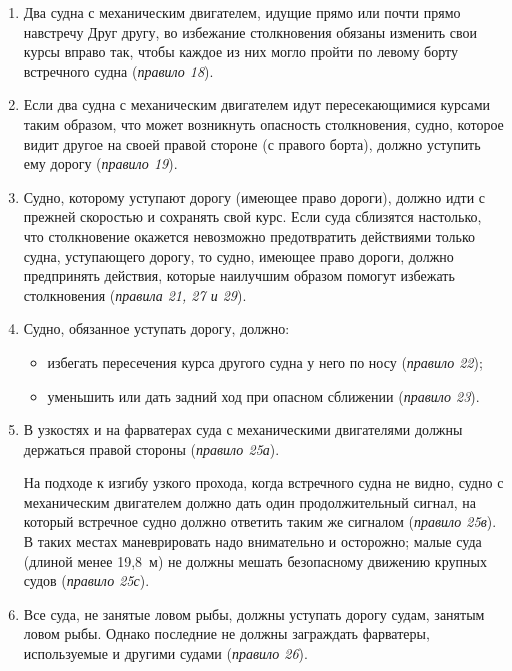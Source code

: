 \documentclass[a4paper, 12pt, twoside, final]{scrbook}
\begin{document}
\begin{enumerate}
\item Два судна с механическим двигателем, идущие прямо или почти прямо навстречу Друг другу, во избежание столкновения обязаны изменить свои курсы вправо так, чтобы каждое из них могло пройти по левому борту встречного судна (\textit{правило 18}).

\item Если два судна с механическим двигателем идут пересекающимися курсами таким образом, что может возникнуть опасность столкновения, судно, которое видит другое на своей правой стороне (с правого борта), должно уступить ему дорогу (\textit{правило 19}).

\item Судно, которому уступают дорогу (имеющее право дороги), должно идти с прежней скоростью и сохранять свой курс. Если суда сблизятся настолько, что столкновение окажется невозможно предотвратить действиями только судна, уступающего дорогу, то судно, имеющее право дороги, должно предпринять действия, которые наилучшим образом помогут избежать столкновения (\textit{правила 21, 27 и 29}).

\item Судно, обязанное уступать дорогу, должно:

\begin{itemize}
\item избегать пересечения курса другого судна у него по носу (\textit{правило 22});
\item уменьшить или дать задний ход при опасном сближении (\textit{правило 23}).
\end{itemize}

\item В узкостях и на фарватерах суда с механическими двигателями должны держаться правой стороны (\textit{правило 25а}).

На подходе к изгибу узкого прохода, когда встречного судна не видно, судно с механическим двигателем должно дать один продолжительный сигнал, на который встречное судно должно ответить таким же сигналом (\textit{правило 25в}). В таких местах маневрировать надо внимательно и осторожно; малые суда (длиной менее 19,8~м) не должны мешать безопасному движению крупных судов (\textit{правило 25с}).

\item Все суда, не занятые ловом рыбы, должны уступать дорогу судам, занятым ловом рыбы. Однако последние не должны заграждать фарватеры, используемые и другими судами (\textit{правило 26}).
\end{enumerate}
\end{document}
